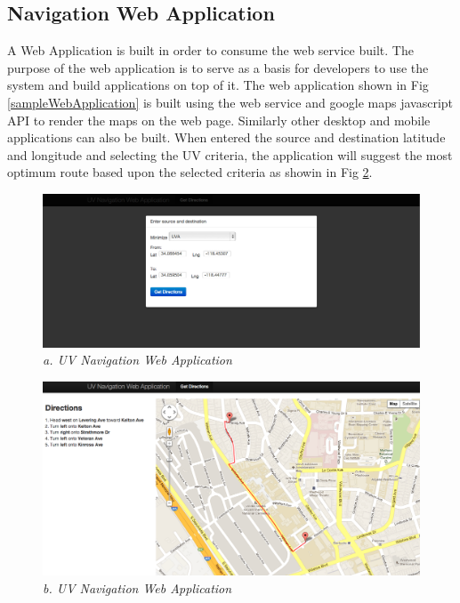 \documentclass[12pt,fullpage,doublespace]{article}
\begin{document}
\subsection{Navigation Web Application}
A Web Application is built in order to consume the web service built. The purpose of the web application is to serve as a basis for developers to use the system and build applications on top of it. The web application shown in Fig \ref{sampleWebApplication} is built using the web service and google maps javascript API to render the maps on the web page. Similarly other desktop and mobile applications can also be built. When entered the source and destination latitude and longitude and selecting the UV criteria, the application will suggest the most optimum route based upon the selected criteria as showin in Fig \ref{fig:webapp}.
\begin{figure}[hb]
\begin{center}
\includegraphics[scale=0.30]{webapp1.png}
\caption{\small \sl a. UV Navigation Web Application }
\label{fig:webapp}
\end{center}
\end{figure}
\begin{figure}
\begin{center}
\includegraphics[scale=0.35]{webapp2.png}
\caption{\small \sl b. UV Navigation Web Application }
\label{fig:webapp}
\end{center}
\end{figure}
\newpage
\end{document}
